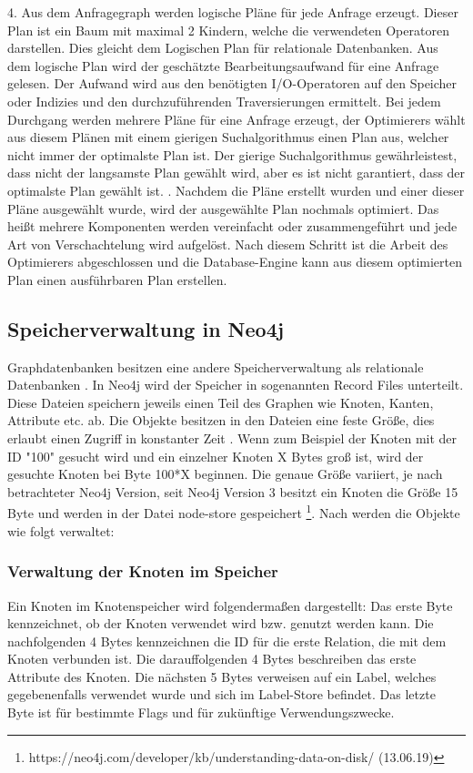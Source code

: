 4. Aus dem Anfragegraph werden logische Pläne für jede Anfrage erzeugt. Dieser Plan ist ein Baum mit maximal 2 Kindern, welche die verwendeten Operatoren darstellen. Dies gleicht dem Logischen Plan für relationale Datenbanken. Aus dem logische Plan wird der geschätzte Bearbeitungsaufwand für eine Anfrage gelesen. Der Aufwand wird aus den benötigten I/O-Operatoren auf den Speicher oder Indizies und den durchzuführenden Traversierungen ermittelt. Bei jedem Durchgang werden mehrere Pläne für eine Anfrage erzeugt, der Optimierers wählt aus diesem Plänen mit einem gierigen Suchalgorithmus einen Plan aus, welcher nicht immer der optimalste Plan ist. Der gierige Suchalgorithmus gewährleistest, dass nicht der langsamste Plan gewählt wird, aber es ist nicht garantiert, dass der optimalste Plan gewählt ist. \newline {}. Nachdem die Pläne erstellt wurden und einer dieser Pläne ausgewählt wurde, wird der ausgewählte Plan nochmals optimiert. Das heißt mehrere Komponenten werden vereinfacht oder zusammengeführt und jede Art von Verschachtelung wird aufgelöst. \newline \newline
Nach diesem Schritt  ist die Arbeit des Optimierers abgeschlossen und die Database-Engine kann aus diesem optimierten Plan einen ausführbaren Plan erstellen. 

\subsection{Speicherverwaltung in Neo4j}
Graphdatenbanken besitzen eine andere Speicherverwaltung als relationale Datenbanken \parencite{angles2012comparison}. In Neo4j wird der Speicher in sogenannten Record Files unterteilt. Diese Dateien speichern jeweils einen Teil des Graphen wie Knoten, Kanten, Attribute etc. ab. Die Objekte besitzen in den Dateien eine feste Größe, dies erlaubt einen Zugriff in konstanter Zeit \parencite{robinson2013graph}. Wenn zum Beispiel der Knoten mit der ID "100" gesucht wird und ein einzelner Knoten X Bytes groß ist, wird der gesuchte Knoten bei Byte 100*X beginnen. Die genaue Größe  variiert, je nach betrachteter Neo4j Version, seit Neo4j Version 3 besitzt ein Knoten die Größe 15 Byte und werden in der Datei node-store gespeichert \footnote{https://neo4j.com/developer/kb/understanding-data-on-disk/ (13.06.19)}. Nach \parencite{robinson2013graph} werden die Objekte wie folgt verwaltet:
\subsubsection{Verwaltung der Knoten im Speicher}
Ein Knoten im Knotenspeicher wird folgendermaßen dargestellt: Das erste Byte kennzeichnet, ob der Knoten verwendet wird bzw. genutzt werden kann. Die nachfolgenden 4 Bytes kennzeichnen die ID für die erste Relation, die mit dem Knoten verbunden ist. Die darauffolgenden 4 Bytes beschreiben das erste Attribute des Knoten. Die nächsten 5 Bytes verweisen auf ein Label, welches gegebenenfalls verwendet wurde und sich im Label-Store befindet. Das letzte Byte ist für bestimmte Flags und für zukünftige Verwendungszwecke. 
